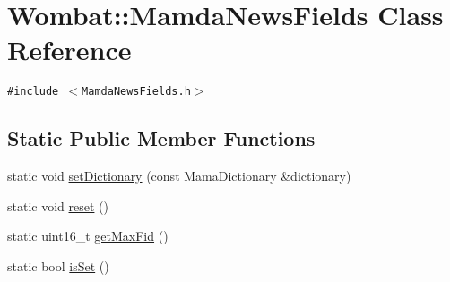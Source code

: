 \hypertarget{classWombat_1_1MamdaNewsFields}{
\section{Wombat::Mamda\-News\-Fields Class Reference}
\label{classWombat_1_1MamdaNewsFields}
}
{\tt \#include $<$Mamda\-News\-Fields.h$>$}

\subsection*{Static Public Member Functions}
\begin{CompactItemize}
\item 
static void \hyperlink{classWombat_1_1MamdaNewsFields_20528b0b0ae1a9268dae01a4945e2ccf}{set\-Dictionary} (const Mama\-Dictionary \&dictionary)
\item 
static void \hyperlink{classWombat_1_1MamdaNewsFields_f917e0a550a8aee5094f4fffae470ac1}{reset} ()
\item 
static uint16\_\-t \hyperlink{classWombat_1_1MamdaNewsFields_a48a2346c2512ccee403482724b29948}{get\-Max\-Fid} ()
\item 
static bool \hyperlink{classWombat_1_1MamdaNewsFields_502cf1ab6dc451258791afa99464667f}{is\-Set} ()
\end{CompactItemize}
